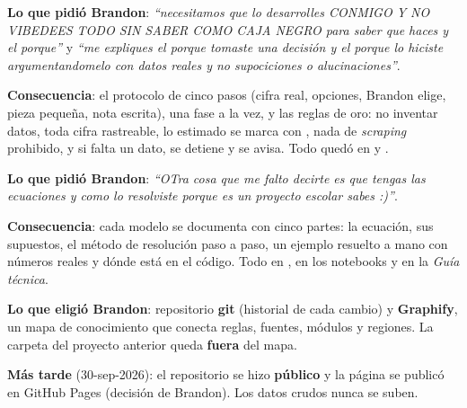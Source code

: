 \begin{opciones}
\textbf{Lo que pidió Brandon}: \emph{``necesitamos que lo desarrolles CONMIGO Y NO VIBEDEES TODO SIN SABER COMO CAJA
NEGRO para saber que haces y el porque''} y \emph{``me expliques el porque tomaste una decisión y el porque lo hiciste
argumentandomelo con datos reales y no supociciones o alucinaciones''}.

\textbf{Consecuencia}: el protocolo de cinco pasos (cifra real, opciones, Brandon elige, pieza pequeña, nota escrita), una
fase a la vez, y las reglas de oro: no inventar datos, toda cifra rastreable, lo estimado se marca con , nada
de \emph{scraping} prohibido, y si falta un dato, se detiene y se avisa. Todo quedó en  y
.
\end{opciones}

\begin{opciones}
\textbf{Lo que pidió Brandon}: \emph{``OTra cosa que me falto decirte es que tengas las ecuaciones y como lo resolviste
porque es un proyecto escolar sabes :)''}.

\textbf{Consecuencia}: cada modelo se documenta con cinco partes: la ecuación, sus supuestos, el método de resolución paso
a paso, un ejemplo resuelto a mano con números reales y dónde está en el código. Todo en
, en los notebooks y en la \emph{Guía técnica}.
\end{opciones}

\begin{opciones}
\textbf{Lo que eligió Brandon}: repositorio \textbf{git} (historial de cada cambio) y \textbf{Graphify}, un mapa de
conocimiento que conecta reglas, fuentes, módulos y regiones. La carpeta del proyecto anterior queda \textbf{fuera} del
mapa.

\textbf{Más tarde} (30-sep-2026): el repositorio se hizo \textbf{público} y la página se publicó en GitHub Pages
(decisión de Brandon). Los datos crudos nunca se suben.
\end{opciones}

